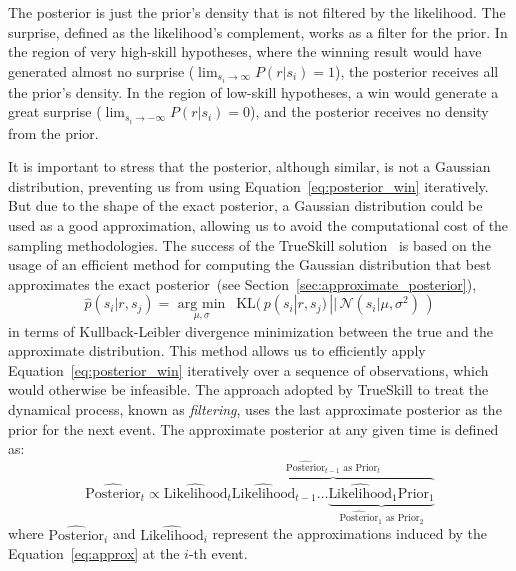 \documentclass[article]{jss}
\newcommand{\N}{\mathcal{N}}
\begin{document}
The posterior is just the prior's density that is not filtered by the likelihood. 
The surprise, defined as the likelihood's complement, works as a filter for the prior. 
In the region of very high-skill hypotheses, where the winning result would have generated almost no surprise ($\lim_{s_i \to \infty}P(r|s_i) = 1$), the posterior receives all the prior's density. 
In the region of low-skill hypotheses, a win would generate a great surprise ($\lim_{s_i \to -\infty}P(r|s_i) = 0$), and the posterior receives no density from the prior. 


It is important to stress that the posterior, although similar, is not a Gaussian distribution, preventing us from using Equation~\ref{eq:posterior_win} iteratively. 
But due to the shape of the exact posterior, a Gaussian distribution could be used as a good approximation, allowing us to avoid the computational cost of the sampling methodologies. 
The success of the TrueSkill solution~\citep{Herbrich2007} is based on the usage of an efficient method for computing the Gaussian distribution that best approximates the exact posterior~(see Section~\ref{sec:approximate_posterior}),
\begin{equation} \label{eq:approx} 
\widehat{p}(s_i| r, s_j) = \underset{\mu, \sigma}{\text{ arg min }} \ \ \text{KL}(\, p(s_i| r, s_j) \, || \,  \N(s_i|\mu, \sigma^2) \, )
\end{equation}
%
in terms of Kullback-Leibler divergence minimization between the true and the approximate distribution. 
This method allows us to efficiently apply Equation~\ref{eq:posterior_win} iteratively over a sequence of observations, which would otherwise be infeasible. 
The approach adopted by TrueSkill to treat the dynamical process, known as \emph{filtering}, uses the last approximate posterior as the prior for the next event. 
The approximate posterior at any given time is defined as:
%
\begin{equation}\label{eq:filter} %
 \widehat{\text{Posterior}}_t \propto \widehat{\text{Likelihood}}_t  \overbrace{\widehat{\text{Likelihood}}_{t-1} \dots \underbrace{\widehat{\text{Likelihood}}_{1} \text{Prior}_1}_{\widehat{\text{Posterior}}_{1} \text{ as } \text{Prior}_{2}} }^{\widehat{\text{Posterior}}_{t-1} \text{ as } \text{Prior}_{t}} %
\end{equation}
%
where {\footnotesize $\widehat{\text{Posterior}}_i$} and {\footnotesize $\widehat{\text{Likelihood}}_i$} represent the approximations induced by the Equation~\ref{eq:approx} at the $i$-th event. 
\end{document}
